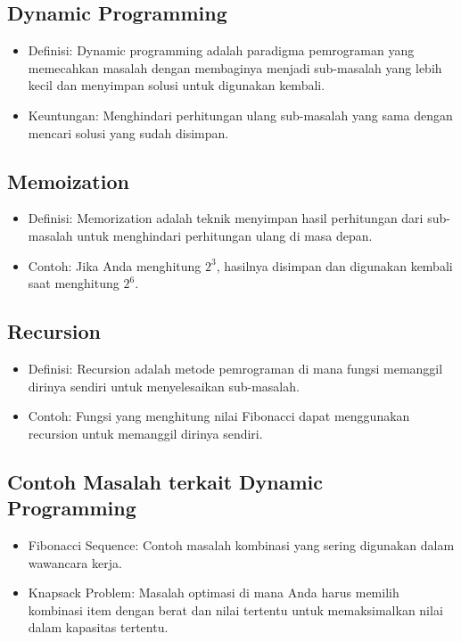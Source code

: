 \documentclass{article}
\begin{document}
\subsection{Dynamic Programming}
\begin{itemize}
    \item Definisi: Dynamic programming adalah paradigma pemrograman yang memecahkan masalah dengan membaginya menjadi sub-masalah yang lebih kecil dan menyimpan solusi untuk digunakan kembali.
    \item Keuntungan: Menghindari perhitungan ulang sub-masalah yang sama dengan mencari solusi yang sudah disimpan.
\end{itemize}

\subsection{Memoization}
\begin{itemize}
    \item Definisi: Memorization adalah teknik menyimpan hasil perhitungan dari sub-masalah untuk menghindari perhitungan ulang di masa depan.
    \item Contoh: Jika Anda menghitung \(2^3\), hasilnya disimpan dan digunakan kembali saat menghitung \(2^6\).
\end{itemize}

\subsection{Recursion}
\begin{itemize}
    \item Definisi: Recursion adalah metode pemrograman di mana fungsi memanggil dirinya sendiri untuk menyelesaikan sub-masalah.
    \item Contoh: Fungsi yang menghitung nilai Fibonacci dapat menggunakan recursion untuk memanggil dirinya sendiri.
\end{itemize}

\subsection{Contoh Masalah terkait Dynamic Programming}
\begin{itemize}
    \item Fibonacci Sequence: Contoh masalah kombinasi yang sering digunakan dalam wawancara kerja.
    \item Knapsack Problem: Masalah optimasi di mana Anda harus memilih kombinasi item dengan berat dan nilai tertentu untuk memaksimalkan nilai dalam kapasitas tertentu.
\end{itemize}
\end{document}
